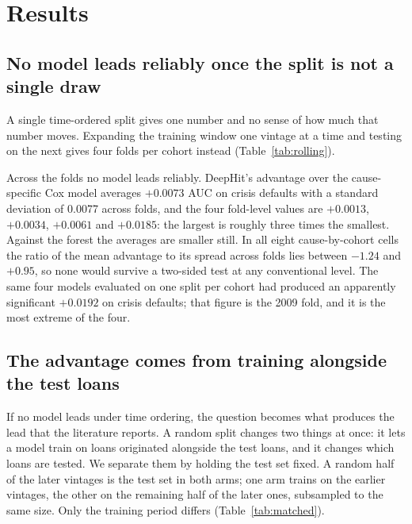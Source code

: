 \documentclass[11pt,journal]{IEEEtran}
\begin{document}
\section{Results}


\subsection{No model leads reliably once the split is not a single draw}
\label{sec:rolling}
A single time-ordered split gives one number and no sense of how much that
number moves. Expanding the training window one vintage at a time and testing on
the next gives four folds per cohort instead (Table~\ref{tab:rolling}).

Across the folds no model leads reliably. DeepHit's advantage over the
cause-specific Cox model averages $+0.0073$ AUC on crisis defaults with a
standard deviation of 0.0077 across folds, and the four fold-level values are
$+0.0013$, $+0.0034$, $+0.0061$ and $+0.0185$: the largest is roughly three
times the smallest. Against the forest the averages are smaller still. In all
eight cause-by-cohort cells the ratio of the mean advantage to its spread across
folds lies between $-1.24$ and $+0.95$, so none would survive a two-sided test
at any conventional level. The same four models evaluated on one split per
cohort had produced an apparently significant $+0.0192$ on crisis defaults; that
figure is the 2009 fold, and it is the most extreme of the four.



\subsection{The advantage comes from training alongside the test loans}
\label{sec:matched}
If no model leads under time ordering, the question becomes what produces the
lead that the literature reports. A random split changes two things at once: it
lets a model train on loans originated alongside the test loans, and it changes
which loans are tested. We separate them by holding the test set fixed. A random
half of the later vintages is the test set in both arms; one arm trains on the
earlier vintages, the other on the remaining half of the later ones, subsampled
to the same size. Only the training period differs
(Table~\ref{tab:matched}).
\end{document}
